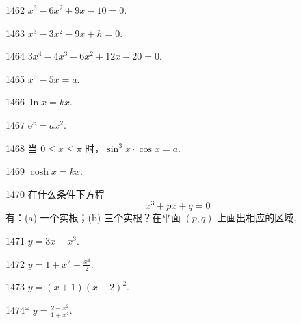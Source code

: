 
\begin{prob}[S]{1462}
$x^3 - 6x^2 + 9x - 10 = 0.$
\end{prob}

\begin{prob}[S]{1463}
$x^3 - 3x^2 - 9x + h = 0.$
\end{prob}

\begin{prob}[S]{1464}
$3x^4 - 4x^3 - 6x^2 + 12x - 20 = 0.$
\end{prob}

\begin{prob}[S]{1465}
$x^5 - 5x = a.$
\end{prob}

\begin{prob}[S]{1466}
$\ln x = kx.$
\end{prob}

\begin{prob}[S]{1467}
$\mathrm{e}^x = ax^2.$
\end{prob}

\begin{prob}[S]{1468}
当 $0 \leqslant x \leqslant \pi$ 时，$\sin^3 x \cdot \cos x = a.$
\end{prob}

\begin{prob}[S]{1469}
$\cosh x = kx.$
\end{prob}

\begin{prob}[M]{1470}
在什么条件下方程
\[
x^3 + px + q = 0
\]
有：(a) 一个实根；(b) 三个实根？在平面 $(p, q)$ 上画出相应的区域.
\end{prob}



\begin{prob}[S]{1471}
$y = 3x - x^3.$
\end{prob}

\begin{prob}[S]{1472}
$y = 1 + x^2 - \frac{x^4}{2}.$
\end{prob}

\begin{prob}[S]{1473}
$y = (x+1)(x-2)^2.$
\end{prob}

\begin{prob}[S]{1474*}
$y = \frac{2 - x^2}{1 + x^4}.$
\end{prob}

